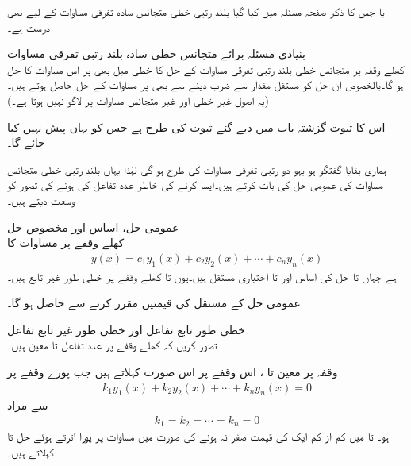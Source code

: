  یا  جس کا ذکر صفحہ  مسئلہ  میں کیا گیا بلند رتبی خطی متجانس سادہ تفرقی مساوات کے لیے بھی درست ہے۔

\quad بنیادی مسئلہ برائے متجانس خطی سادہ بلند رتبی تفرقی مساوات\\
کھلے وقفہ  پر متجانس خطی بلند رتبی تفرقی مساوات  کے حل کا خطی میل بھی  پر اس مساوات کا حل ہو گا۔بالخصوص ان حل کو مستقل مقدار سے ضرب دینے سے بھی  پر  مساوات کے حل حاصل ہوتے ہیں۔(یہ اصول غیر خطی اور  غیر متجانس مساوات پر لاگو نہیں ہوتا ہے۔)

اس کا ثبوت گزشتہ باب میں دیے گئے ثبوت کی طرح ہے جس کو یہاں پیش نہیں کیا جائے گا۔

ہماری بقایا گفتگو ہو بہو دو رتبی تفرقی مساوات کی طرح ہو گی لہٰذا یہاں بلند رتبی خطی متجانس مساوات کی عمومی حل کی بات کرتے ہیں۔ایسا کرنے کی خاطر  عدد تفاعل کی   ہونے کی تصور کو وسعت دیتے ہیں۔

\quad عمومی حل، اساس اور مخصوص حل\\
کھلے وقفے  پر مساوات  کا 
\begin{align}
y(x)=c_1y_1(x)+c_2y_2(x)+\cdots +c_ny_n(x)
\end{align}
ہے جہاں  تا  حل کی اساس اور  تا  اختیاری مستقل ہیں۔یوں  تا  کھلے وقفے پر خطی طور غیر تابع ہیں۔ 

عمومی حل کے مستقل کی قیمتیں مقرر کرنے سے  حاصل ہو گا۔

\quad خطی طور تابع تفاعل اور خطی طور غیر تابع تفاعل\\
تصور کریں کہ کھلے وقفے  پر   عدد تفاعل  تا  معین ہیں۔

 وقفہ  پر معین  تا ،  اس وقفے   پر اس صورت  کہلاتے ہیں جب پورے وقفے پر
\begin{align}\label{مساوات_سادہ_بلند_خطی_طور_غیر_تابع_الف}
k_1 y_1(x)+k_2 y_2(x)+\cdots+k_ny_n(x)=0
\end{align}
سے مراد 
\begin{align*}
k_1=k_2= \cdots =k_n=0 
\end{align*}
ہو۔ تا  میں  کم از کم ایک کی قیمت صفر نہ ہونے کی صورت میں مساوات  پر پورا اترتے ہوئے حل  تا   کہلاتے ہیں۔

